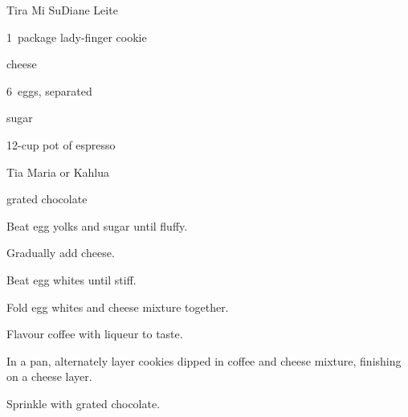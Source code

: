 \begin{recipe}{Tira Mi Su}{Diane Leite}{}

\begin{ingredients}
\item 1~package lady-finger cookie
\item {}  cheese
\item 6~eggs, separated
\item \C{\threequarter} sugar
\item 12-cup pot of espresso
\item Tia Maria or Kahlua
\item grated chocolate
\end{ingredients}

\begin{directions}
\item Beat egg yolks and sugar until fluffy.
\item Gradually add cheese.
\item Beat egg whites until stiff.
\item Fold egg whites and cheese mixture together.
\item Flavour coffee with liqueur to taste.
\item In a pan, alternately layer cookies dipped in coffee and cheese mixture, finishing on a cheese layer.
\item Sprinkle with grated chocolate.
\end{directions}

\end{recipe}
